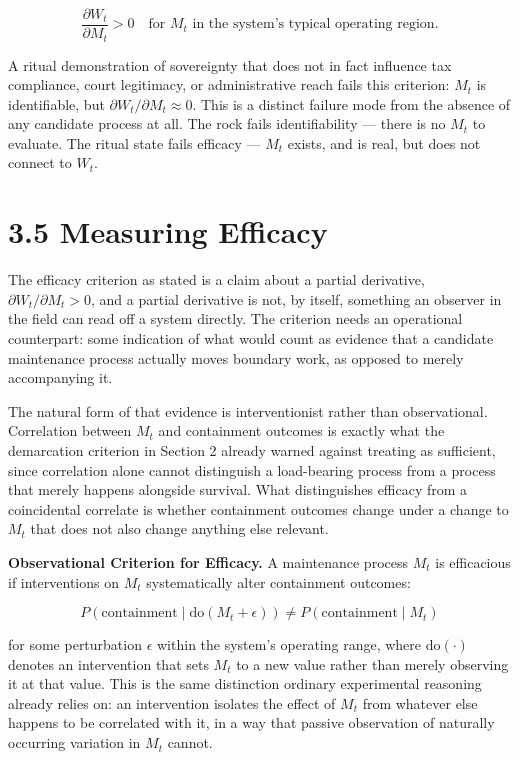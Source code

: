 \documentclass[11pt]{article}
\theoremstyle{plain}
\begin{document}
\[\frac{\partial W_t}{\partial M_t} > 0 \quad \text{for } M_t \text{ in the system's typical operating region}.\]

A ritual demonstration of sovereignty that does not in fact influence tax compliance, court legitimacy, or administrative reach fails this criterion: \(M_t\) is identifiable, but \(\partial W_t / \partial M_t \approx 0\). This is a distinct failure mode from the absence of any candidate process at all. The rock fails identifiability --- there is no \(M_t\) to evaluate. The ritual state fails efficacy --- \(M_t\) exists, and is real, but does not connect to \(W_t\).

\section*{3.5 Measuring Efficacy}

The efficacy criterion as stated is a claim about a partial derivative, \(\partial W_t/\partial M_t > 0\), and a partial derivative is not, by itself, something an observer in the field can read off a system directly. The criterion needs an operational counterpart: some indication of what would count as evidence that a candidate maintenance process actually moves boundary work, as opposed to merely accompanying it.

The natural form of that evidence is interventionist rather than observational. Correlation between \(M_t\) and containment outcomes is exactly what the demarcation criterion in Section 2 already warned against treating as sufficient, since correlation alone cannot distinguish a load-bearing process from a process that merely happens alongside survival. What distinguishes efficacy from a coincidental correlate is whether containment outcomes change under a change to \(M_t\) that does not also change anything else relevant.

\textbf{Observational Criterion for Efficacy.} A maintenance process \(M_t\) is efficacious if interventions on \(M_t\) systematically alter containment outcomes:

\[P(\text{containment} \mid \mathrm{do}(M_t + \epsilon)) \neq P(\text{containment} \mid M_t)\]

for some perturbation \(\epsilon\) within the system's operating range, where \(\mathrm{do}(\cdot)\) denotes an intervention that sets \(M_t\) to a new value rather than merely observing it at that value. This is the same distinction ordinary experimental reasoning already relies on: an intervention isolates the effect of \(M_t\) from whatever else happens to be correlated with it, in a way that passive observation of naturally occurring variation in \(M_t\) cannot.
\end{document}
